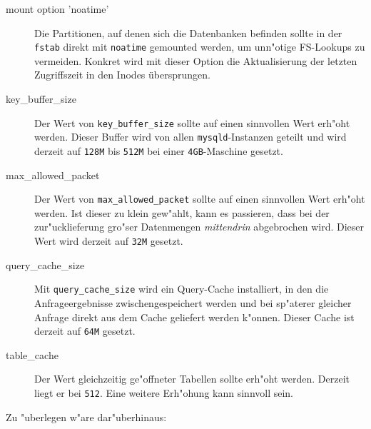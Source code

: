 \documentclass[11pt, twoside, a4paper, BCOR8mm, DIV12, bibtotoc,idxtotoc]{scrbook}
\begin{document}
\begin{description}
\item[mount option 'noatime'] Die Partitionen, auf denen sich die
  Datenbanken befinden sollte in der \texttt{fstab} direkt mit
  \texttt{noatime} gemounted werden, um unn"otige FS-Lookups zu
  vermeiden. Konkret wird mit dieser Option die Aktualisierung der
  letzten Zugriffszeit in den Inodes übersprungen.
\item[key\_buffer\_size] Der Wert von
  \texttt{key\_buffer\_size} sollte auf einen sinnvollen Wert erh"oht
  werden. Dieser Buffer wird von allen \texttt{mysqld}-Instanzen
  geteilt und wird derzeit auf \texttt{128M} bis \texttt{512M} bei
  einer \texttt{4GB}-Maschine gesetzt.
\item[max\_allowed\_packet] Der Wert von
  \texttt{max\_allowed\_packet} sollte auf einen sinnvollen Wert
  erh"oht werden. Ist dieser zu klein gew"ahlt, kann es passieren,
  dass bei der zur"ucklieferung gro"ser Datenmengen
  \textit{mittendrin} abgebrochen wird. Dieser Wert wird derzeit auf
  \texttt{32M} gesetzt.
\item[query\_cache\_size] Mit \texttt{query\_cache\_size}
  wird ein Query-Cache installiert, in den die Anfrageergebnisse
  zwischengespeichert werden und bei sp"aterer gleicher Anfrage direkt
  aus dem Cache geliefert werden k"onnen. Dieser Cache ist derzeit auf
  \texttt{64M} gesetzt.
  \item[table\_cache] Der Wert gleichzeitig ge"offneter Tabellen
    sollte erh"oht werden. Derzeit liegt er bei \texttt{512}. Eine
    weitere Erh"ohung kann sinnvoll sein.
\end{description}

Zu "uberlegen w"are dar"uberhinaus:
\end{document}
